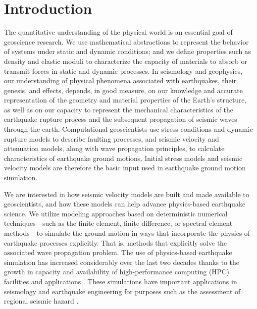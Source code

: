 
\section{Introduction}
\label{sec:introduction}

\vspace{-1em} %

The quantitative understanding of the physical world is an essential goal of geoscience research. We use mathematical abstractions to represent the behavior of systems under static and dynamic conditions; and we define properties such as density and elastic moduli to characterize the capacity of materials to absorb or transmit forces in static and dynamic processes. In seismology and geophysics, our understanding of physical phenomena associated with earthquakes, their genesis, and effects, depends, in good measure, on our knowledge and accurate representation of the geometry and material properties of the Earth's structure, as well as on our capacity to represent the mechanical characteristics of the earthquake rupture process and the subsequent propagation of seismic waves through the earth. Computational geoscientists use stress conditions and dynamic rupture models to describe faulting processes, and seismic velocity and attenuation models, along with wave propagation principles, to calculate characteristics of earthquake ground motions. Initial stress models and seismic velocity models are therefore the basic input used in earthquake ground motion simulation.

We are interested in how seismic velocity models are built and made available to geoscientists, and how these models can help advance physics-based earthquake science. We utilize modeling approaches based on deterministic numerical techniques---such as the finite element, finite difference, or spectral element methods---to simulate the ground motion in ways that incorporate the physics of earthquake processes explicitly. That is, methods that explicitly solve the associated wave propagation problem. The use of physics-based earthquake simulation has increased considerably over the last two decades thanks to the growth in capacity and availability of high-performance computing (HPC) facilities and applications \citep[e.g.,][]{Aagaard_2008_BSSA2, Olsen_2009_GRL, Bielak_2010_GJI, Cui_2010_Proc}. These simulations have important applications in seismology and earthquake engineering for purposes such as the assessment of regional seismic hazard \citep[e.g.,][]{Graves_2011_PAG}.

